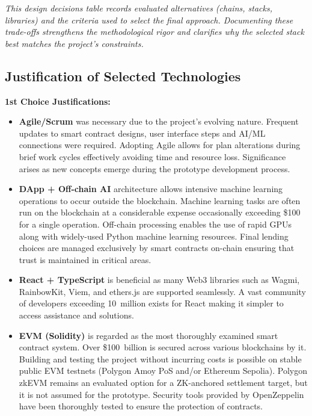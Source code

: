 \documentclass[12pt,a4paper]{report}
\begin{document}
\vspace{2pt}
\noindent\textit{\small This design decisions table records evaluated alternatives (chains, stacks, libraries) and the criteria used to select the final approach. Documenting these trade-offs strengthens the methodological rigor and clarifies why the selected stack best matches the project's constraints.}

\subsection{Justification of Selected Technologies}

\textbf{1st Choice Justifications:}

\begin{itemize}[noitemsep]
\item \textbf{Agile/Scrum} was necessary due to the project's evolving nature. Frequent updates to smart contract designs, user interface steps and AI/ML connections were required. Adopting Agile allows for plan alterations during brief work cycles effectively avoiding time and resource loss. Significance arises as new concepts emerge during the prototype development process.

\item \textbf{DApp + Off-chain AI} architecture allows intensive machine learning operations to occur outside the blockchain. Machine learning tasks are often run on the blockchain at a considerable expense occasionally exceeding \$100 for a single operation. Off-chain processing enables the use of rapid GPUs along with widely-used Python machine learning resources. Final lending choices are managed exclusively by smart contracts on-chain ensuring that trust is maintained in critical areas.

\item \textbf{React + TypeScript} is beneficial as many Web3 libraries such as Wagmi, RainbowKit, Viem, and ethers.js are supported seamlessly. A vast community of developers exceeding 10~million exists for React making it simpler to access assistance and solutions.

\item \textbf{EVM (Solidity)} is regarded as the most thoroughly examined smart contract system. Over \$100~billion is secured across various blockchains by it. Building and testing the project without incurring costs is possible on stable public EVM testnets (Polygon Amoy PoS and/or Ethereum Sepolia). Polygon zkEVM remains an evaluated option for a ZK-anchored settlement target, but it is not assumed for the prototype. Security tools provided by OpenZeppelin have been thoroughly tested to ensure the protection of contracts.


\end{itemize}
\end{document}
